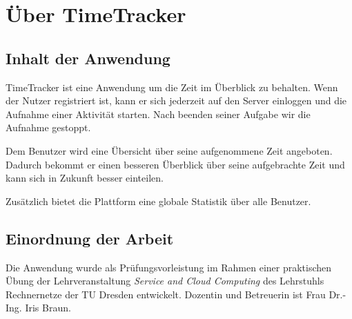 \section{Über TimeTracker}

\subsection{Inhalt der Anwendung}
TimeTracker ist eine Anwendung um die Zeit im Überblick zu behalten. Wenn der Nutzer registriert ist, kann er sich jederzeit auf den Server einloggen und die Aufnahme einer Aktivität starten. Nach beenden seiner Aufgabe wir die Aufnahme gestoppt. 

Dem Benutzer wird eine Übersicht über seine aufgenommene Zeit angeboten. Dadurch bekommt er einen besseren Überblick über seine aufgebrachte Zeit und kann sich in Zukunft besser einteilen. 

Zusätzlich bietet die Plattform eine globale Statistik über alle Benutzer.

\subsection{Einordnung der Arbeit}
Die Anwendung wurde als Prüfungsvorleistung im Rahmen einer praktischen Übung der Lehrveranstaltung \textit{Service and Cloud Computing} des Lehrstuhls Rechnernetze der TU Dresden entwickelt. Dozentin und Betreuerin ist Frau Dr.-Ing. Iris Braun. 